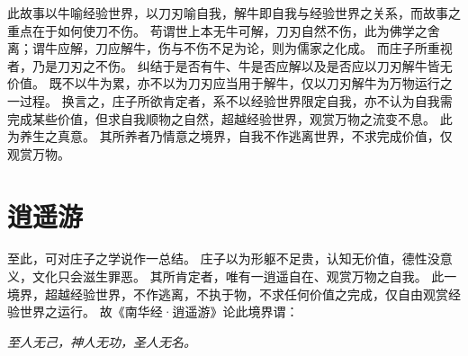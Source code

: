 \documentclass[11pt]{article}
\begin{document}
此故事以牛喻经验世界，以刀刃喻自我，解牛即自我与经验世界之关系，而故事之重点在于如何使刀不伤。
苟谓世上本无牛可解，刀刃自然不伤，此为佛学之舍离；谓牛应解，刀应解牛，伤与不伤不足为论，则为儒家之化成。
而庄子所重视者，乃是刀刃之不伤。
纠结于是否有牛、牛是否应解以及是否应以刀刃解牛皆无价值。
既不以牛为累，亦不以为刀刃应当用于解牛，仅以刀刃解牛为万物运行之一过程。
换言之，庄子所欲肯定者，系不以经验世界限定自我，亦不认为自我需完成某些价值，但求自我顺物之自然，超越经验世界，观赏万物之流变不息。
此为养生之真意。
其所养者乃情意之境界，自我不作逃离世界，不求完成价值，仅观赏万物。

\section{逍遥游}
至此，可对庄子之学说作一总结。
庄子以为形躯不足贵，认知无价值，德性没意义，文化只会滋生罪恶。
其所肯定者，唯有一逍遥自在、观赏万物之自我。
此一境界，超越经验世界，不作逃离，不执于物，不求任何价值之完成，仅自由观赏经验世界之运行。
故《南华经·逍遥游》论此境界谓：

\textit{至人无己，神人无功，圣人无名。}
  
\end{document}
